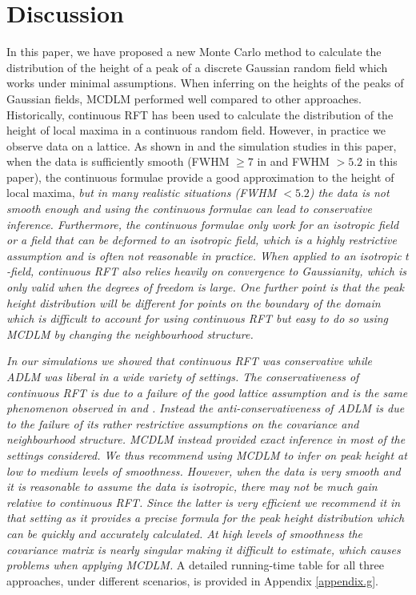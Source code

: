 \documentclass{article}
\newcommand{\nt}[1]{\textit{\color{red} #1}}
\begin{document}
\section{Discussion}
\label{sec6}
In this paper, we have proposed a new Monte Carlo method to calculate the distribution of the height of a peak of a discrete Gaussian random field which works under minimal assumptions. When inferring on the heights of the peaks of Gaussian fields, MCDLM performed well compared to other approaches. Historically, continuous RFT has been used to calculate the distribution of the height of local maxima in a continuous random field. However, in practice we observe data on a lattice. As shown in \cite{schwartzman2019peak} and the simulation studies in this paper, when the data is sufficiently smooth (FWHM $\ge 7$ in \cite{schwartzman2019peak} and FWHM $> 5.2$ in this paper), the continuous formulae provide a good approximation to the height of local maxima, \nt{but in many realistic situations (FWHM $< 5.2$) the data is not smooth enough and using the continuous formulae can lead to conservative inference. Furthermore, the continuous formulae only work for an isotropic field or a field that can be deformed to an isotropic field, which is a highly restrictive assumption and is often not reasonable in practice. When applied to an isotropic $t$-field, continuous RFT also relies heavily on convergence to Gaussianity, which is only valid when the degrees of freedom is large. One further point is that the peak height distribution will be different for points on the boundary of the domain which is difficult to account for using continuous RFT but easy to do so using MCDLM by changing the neighbourhood structure. }

\nt{In our simulations we showed that continuous RFT was conservative while ADLM was liberal in a wide variety of settings. The conservativeness of continuous RFT is due to a failure of the good lattice assumption and is the same phenomenon observed in \cite{telschow2023riding} and \cite{davenport2023robust}. Instead the anti-conservativeness of ADLM is due to the failure of its rather restrictive assumptions on the covariance and neighbourhood structure. MCDLM instead provided exact inference in most of the settings considered. We thus recommend using MCDLM to infer on peak height at low to medium levels of smoothness. However, when the data is very smooth and it is reasonable to assume the data is isotropic, there may not be much gain relative to continuous RFT. Since the latter is very efficient we recommend it in that setting as it provides a precise formula for the peak height distribution which can be quickly and accurately calculated. At high levels of smoothness the covariance matrix is nearly singular making it difficult to estimate, which causes problems when applying MCDLM.} A detailed running-time table for all three approaches, under different scenarios, is provided in Appendix \ref{appendix.g}.
\end{document}

